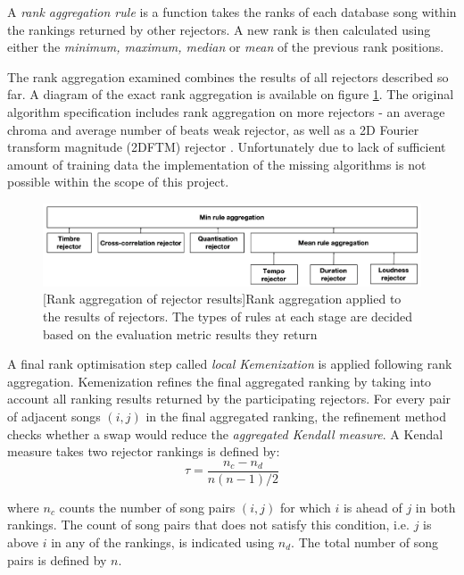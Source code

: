 A \textit{rank aggregation rule} is a function takes the ranks of each database
song within the rankings returned by other rejectors. A new rank is then
calculated using either the \textit{minimum, maximum, median} or \textit{mean}
of the previous rank positions. 

The rank aggregation examined combines the results of all rejectors described so
far. A diagram of the exact rank aggregation is available on figure
\ref{fig:raschema}. The original algorithm specification includes rank
aggregation on more rejectors - an average chroma and average number of beats
weak rejector, as well as a 2D Fourier transform magnitude (2DFTM) rejector
\cite{osmalsky2016enhancing}. Unfortunately due to lack of sufficient amount of
training data the implementation of the missing algorithms is not possible
within the scope of this project.

\begin{figure}[H]
   \centering 
   \includegraphics[width=\textwidth]{Algorithms/raschema2.png}
   [Rank aggregation of rejector results]{Rank aggregation applied to the results of rejectors. The types of rules at each stage are decided based on the evaluation metric results they return}
   \label{fig:raschema}
\end{figure}

A final rank optimisation step called \textit{local Kemenization} is applied
following rank aggregation. Kemenization refines the final aggregated ranking by
taking into account all ranking results returned by the participating rejectors.
For every pair of adjacent songs $(i, j)$ in the final aggregated ranking, the
refinement method checks whether a swap would reduce the \textit{aggregated
Kendall measure}. A Kendal measure takes two rejector rankings is defined by:
\begin{equation}
    \tau = \frac{n_c - n_d}{n(n-1)/2}
\end{equation}

where $n_c$ counts the number of song pairs $(i, j)$ for which $i$ is ahead
of $j$ in both rankings. The count of song pairs that does not satisfy this
condition, i.e. $j$ is above $i$ in any of the rankings, is indicated using
$n_d$. The total number of song pairs is defined by $n$.


